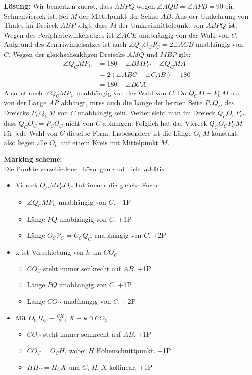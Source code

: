 \documentclass[language=german,style=solution]{smo}
\begin{document}
\begin{enumerate}
\textbf{Lösung:}
Wir bemerken zuerst, dass $ABPQ$ wegen $\angle AQB = \angle APB = 90$ ein Sehnenviereck ist. Sei $M$ der Mittelpunkt der Sehne $AB$. Aus der Umkehrung von Thales im Dreieck $ABP$ folgt, dass $M$ der Umkreismittelpunkt von $ABPQ$ ist. \\
Wegen des Peripheriewinkelsatzes ist $\angle ACB$ unabhängig von der Wahl von $C$. Aufgrund des Zentriwinkelsatzes ist auch $\angle Q_CO_CP_C = 2\angle ACB$ unabhängig von $C$. Wegen der gleichschenkligen Dreiecke $AMQ$ und $MBP$ gilt:
\begin{align*}	
	\angle Q_CMP_C &= 180 - \angle BMP_C - \angle Q_CMA\\
	&=2(\angle ABC + \angle CAB) - 180\\
	&= 180 - \angle BCA.
\end{align*}
Also ist auch $\angle Q_CMP_C$ unabhängig von der Wahl von $C$. Da $Q_CM = P_CM$ nur von der Länge $AB$ abhängt, muss auch die Länge der letzten Seite $P_CQ_C$ des Dreiecks $P_CQ_CM$ von $C$ unabhängig sein. Weiter sieht man im Dreieck $Q_CO_CP_C$, dass $Q_CO_C = P_CO_C$ nicht von $C$ abhängen. Folglich hat das Viereck $Q_CO_CP_CM$ für jede Wahl von $C$ dieselbe Form. Insbesondere ist die Länge $O_CM$ konstant, also liegen alle $O_C$ auf einem Kreis mit Mittelpunkt $M$.

\textbf{Marking scheme:} \\
Die Punkte verschiedener Lösungen sind nicht additiv.
\begin{itemize}
\item Viereck $Q_CMP_CO_C$ hat immer die gleiche Form:
	\begin{itemize}
	\item $\angle Q_CMP_C$ unabhängig von $C$. +1P
	\item Länge $PQ$ unabhängig von $C$. +1P
	\item Länge $O_CP_C = O_CQ_C$ unabhängig von $C$. +2P
	\end{itemize}
\item $\omega$ ist Verschiebung von $k$ um $CO_C$
	\begin{itemize}
	\item $CO_C$ steht immer senkrecht auf $AB$. +1P
	\item Länge $PQ$ unabhängig von $C$. +1P
	\item Länge $CO_C$ unabhängig von $C$. +2P
	\end{itemize}
\item Mit $O_CH_C = \frac{CX}{2}$, $X = k \cap CO_C$
	\begin{itemize}
	\item $CO_C$ steht immer senkrecht auf $AB$. +1P
	\item $CO_C = O_CH$, wobei $H$ Höhenschnittpunkt. +1P
	\item $HH_C = H_CX$ und $C$, $H$, $X$ kollinear. +1P
	\end{itemize}
\end{itemize}
\newpage


\end{enumerate}
\end{document}
